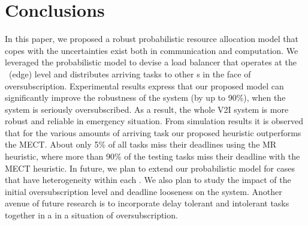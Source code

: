\section{Conclusions}\label{sec:conclsn}
In this paper, we proposed a robust probabilistic resource allocation model that copes with the uncertainties exist both in communication and computation. We leveraged the probabilistic model to devise a load balancer that operates at the \bs~(edge) level and distributes arriving tasks to other \bs s in the face of oversubscription. Experimental results express that our proposed model can significantly improve the robustness of the system (by up to 90\%), when the system is seriously oversubscribed. As a result, the whole V2I system is more robust and reliable in emergency situation. From simulation results it is observed that for the various amounts of arriving task our proposed heuristic outperforms the MECT. About only 5\% of all tasks miss their deadlines using the MR heuristic, where more than 90\% of the testing tasks miss their deadline with the MECT heuristic. In future, we plan to extend our probabilistic model for cases that have heterogeneity within each \bs. We also plan to study the impact of the initial oversubscription level and deadline looseness on the system. Another avenue of future research is to incorporate delay tolerant and intolerant tasks together in a \bs in a situation of oversubscription.%